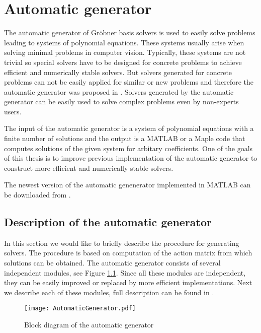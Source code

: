 \chapter{Automatic generator}
The automatic generator of Gr\"obner basis solvers is used to easily solve problems leading to systems of polynomial equations. These systems usually arise when solving minimal problems \cite{MinimalProblems} in computer vision. Typically, these systems are not trivial so special solvers have to be designed for concrete problems to achieve efficient and numerically stable solvers. But solvers generated for concrete problems can not be easily applied for similar or new problems and therefore the automatic generator was proposed in \cite{AutoGen}. Solvers generated by the automatic generator can be easily used to solve complex problems even by non-experts users.

The input of the automatic generator is a system of polynomial equations with a finite number of solutions and the output is a MATLAB or a Maple code that computes solutions of the given system for arbitary coefficients. One of the goals of this thesis is to improve previous implementation \cite{AutoGen} of the automatic generator to construct more efficient and numerically stable solvers.

The newest version of the automatic genenerator implemented in MATLAB can be downloaded from \cite{AutomaticGenerator}.

\section{Description of the automatic generator}
In this section we would like to briefly describe the procedure for generating solvers. The procedure is based on computation of the action matrix from which solutions can be obtained. The automatic generator consists of several independent modules, see Figure \ref{autogen:blockDiagram}. Since all these modules are independent, they can be easily improved or replaced by more efficient implementations. Next we describe each of these modules, full description can be found in \cite{AutoGen, KukelovaAlgMethods}.

\begin{figure}[ht]
  \centering
  \texttt{[image: AutomaticGenerator.pdf]}
  \caption{Block diagram of the automatic generator}
  \label{autogen:blockDiagram}
\end{figure}

